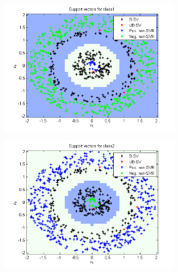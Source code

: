 \documentclass{article}
\begin{document}
\begin{figure}
\begin{subfigure}{.5\textwidth}
  \centering
  \includegraphics[width=.8\linewidth]{Classification/1b/nu_g/sv1}
 
\end{subfigure}%
\begin{subfigure}{.5\textwidth}
  \centering
  \includegraphics[width=.8\linewidth]{Classification/1b/nu_g/sv2}
  
\end{subfigure}
\end{figure}
\end{document}
